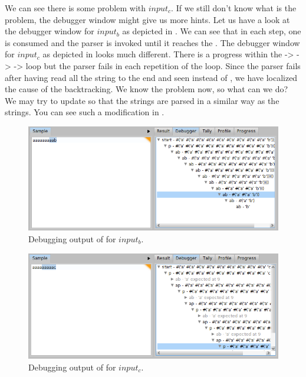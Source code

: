 \documentclass[a4paper,10pt,twoside]{book}
\begin{document}
We can see there is some problem with $input_c$.
If we still don't know what is the problem, the debugger window might give us more hints.
Let us have a look at the debugger window for $input_b$ as depicted in .
We can see that in each step, one  is consumed and the parser  is invoked until it reaches the .
The debugger window for $input_c$ as depicted in  looks much different.
There is a progress within the  ->  ->  ->  loop but the parser  fails in each repetition of the loop.
Since the parser  fails after having read all the string to the end and seen  instead of , we have localized the cause of the backtracking.
We know the problem now, so what can we do?
We may try to update  so that the  strings are parsed in a similar way as the  strings.
You can see such a modification in .


\begin{figure}
  \begin{center}
    \includegraphics[width=\linewidth]{example-debugAaab}
    \caption{Debugging output of  for $input_b$. \label{fig:pp/example-debugAaab}}
  \end{center}
\end{figure}

\begin{figure}
  \begin{center}
    \includegraphics[width=\linewidth]{example-debugAaac}
    \caption{Debugging output of  for $input_c$. \label{fig:pp/example-debugAaac}}
  \end{center}
\end{figure}
\end{document}
